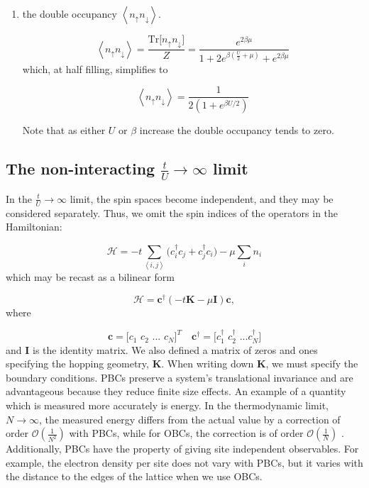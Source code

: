 \begin{enumerate}
\item the double occupancy $\left\langle n_\uparrow n_\downarrow \right\rangle$.

\begin{equation}
\left\langle n_\uparrow n_\downarrow \right\rangle = \frac{\text{Tr} \big[ n_\uparrow n_\downarrow \big]}{Z} = \frac{e^{2\beta\mu}}{1 + 2 e^{\beta (\frac{U}{2} + \mu )} + e^{2\beta\mu}}
\end{equation}
which, at half filling, simplifies to

\begin{equation}
\left\langle n_\uparrow n_\downarrow \right\rangle = \frac{1}{2 ( 1 + e^{\beta U/2} )}
\end{equation}

Note that as either $U$ or $\beta$ increase the double occupancy tends to zero.
\end{enumerate}

\subsection{The non-interacting $\frac{t}{U} \rightarrow \infty$ limit}

In the $\frac{t}{U} \rightarrow \infty$ limit, the spin spaces become independent, and they may be considered separately.
Thus, we omit the spin indices of the operators in the Hamiltonian:

\begin{equation}
\mathcal{H} = -t \sum_{\left\langle i, j \right\rangle} \big( c_i^\dagger c_j + c_j^\dagger c_i \big) - \mu \sum_i n_i
\end{equation}
which may be recast as a bilinear form

\begin{equation}
\mathcal{H} = \bm c^\dagger ( -t \bm K - \mu \bm I ) \bm c ,
\end{equation}
where

\begin{equation}
\bm c = \bigg[ c_1 \,\, c_2 \,\, ... \,\, c_N \bigg]^T \quad \bm c^\dagger = \bigg[c_1^\dagger \,\, c_2^\dagger \,\, ... c_N^\dagger \bigg]
\end{equation}
and $\bm I$ is the identity matrix.
We also defined a matrix of zeros and ones specifying the hopping geometry, $\bm K$.
When writing down $\bm K$, we must specify the boundary conditions.
\acp{PBC} preserve a system's translational invariance and are advantageous because they reduce finite size effects.
An example of a quantity which is measured more accurately is energy.
In the thermodynamic limit, $N \rightarrow \infty$, the measured energy differs from the actual value by a correction of order $\mathcal{O}(\frac{1}{N^2})$ with \acp{PBC}, while for \acp{OBC}, the correction is of order $\mathcal{O}(\frac{1}{N})$ \cite{hou_numerical_2009}.
Additionally, \acp{PBC} have the property of giving site independent observables.
For example, the electron density per site does not vary with \acp{PBC}, but it varies with the distance to the edges of the lattice when we use \acp{OBC}.

